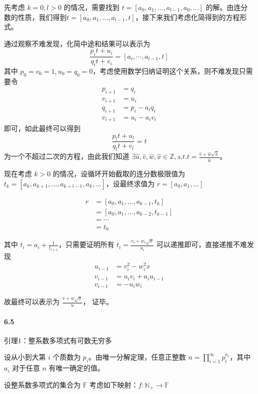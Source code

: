 \documentclass[12pt, a4paper, oneside]{ctexart}
\begin{document}
	先考虑 $k=0,l>0$ 的情况，需要找到 $t=[a_0,a_1,\dots,a_{l-1},a_0,\dots]$ 的解。由连分数的性质，我们得到$t=[a_0,a_1,\dots,a_{l-1},t]$，接下来我们考虑化简得到的方程形式。
	
	通过观察不难发现，化简中途和结果可以表示为 $$\frac{p_it+u_i}{q_it+v_i}=[a_i,\cdots,a_{l-1},t]$$ 其中 $p_0=v_0=1,u_0=q_0=0$，考虑使用数学归纳证明这个关系，则不难发现只需要令 $$\begin{aligned}p_{i+1}&=q_i\\v_{i+1}&=u_i\\q_{i+1}&=p_i-a_iq_i\\v_{i+1}&=u_i-a_iv_i\end{aligned}$$ 即可，如此最终可以得到 $$\frac{p_lt+u_l}{q_lt+v_l}=t$$
	为一个不超过二次的方程，由此我们知道 $\exists \hat{u},\hat{v},\hat{w},\hat{x}\in \mathbb Z,\textit{s.t.} t=\frac{\hat{v}+\hat{w}\sqrt{\hat{x}}}{\hat{u}}$。
	
	现在考虑 $k>0$ 的情况，设循环开始截取的连分数极限值为 $t_k=[a_k,a_{k+1},\dots,a_{k+l-1},a_k,\dots]$，设最终求值为 $r=[a_0,a_1,\dots]$
	
	$$
	\begin{aligned}
		r&=[a_0,a_1,\dots,a_{k-1},t_k]\\
		&=[a_0,a_1,\dots,a_{k-2},t_{k-1}]\\
		&=\cdots\\
		&=t_0
	\end{aligned}
	$$
	
	其中 $t_i=a_i+\frac{1}{t_{i+1}}$，只需要证明所有 $t_i=\frac{v_i+w_i\sqrt{x}}{u_i}$ 可以递推即可，直接递推不难发现
	$$\begin{aligned}
		u_{i-1}&=v_i^2-w_i^2x\\
		v_{i-1}&=u_iv_i+a_iu_{i-1}\\
		v_{i-1}&=-u_iw_i
	\end{aligned}$$
	
	故最终可以表示为 $\frac{v+w\sqrt x}u$，
	证毕。
	
	\paragraph{6.5}
	
	引理1：{\kaishu 整系数多项式有可数无穷多}
	
	设从小到大第 $i$  个质数为 $p_i$。由唯一分解定理，任意正整数 $n=\prod\limits_{i=1}^\infty p_i^{a_i}$，其中 $a_i$ 对于任意 $n$ 有唯一确定的值。
	
	设整系数多项式的集合为 $\mathbb F$ 考虑如下映射：$f:\mathbb N_+\rightarrow\mathbb F$
	
\end{document}
